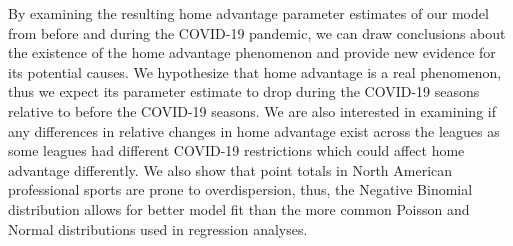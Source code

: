 By examining the resulting home advantage parameter estimates of our model from before and during the COVID-19 pandemic, we can draw conclusions about the existence of the home advantage phenomenon and provide new evidence for its potential causes. We hypothesize that home advantage is a real phenomenon, thus we expect its parameter estimate to drop during the COVID-19 seasons relative to before the COVID-19 seasons. We are also interested in examining if any differences in relative changes in home advantage exist across the leagues as some leagues had different COVID-19 restrictions which could affect home advantage differently. We also show that point totals in North American professional sports are prone to overdispersion, thus, the Negative Binomial distribution allows for better model fit than the more common Poisson and Normal distributions used in regression analyses.